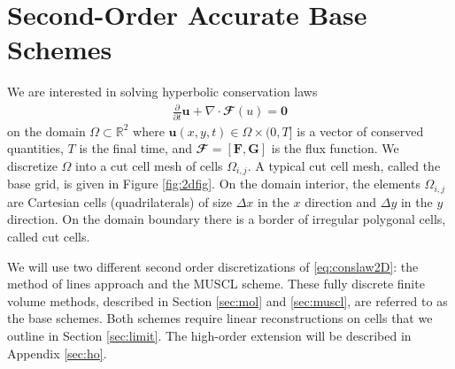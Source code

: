 \section{Second-Order Accurate Base Schemes}\label{sec:basefv}
We are interested in solving hyperbolic conservation laws 
\begin{equation}
\begin{aligned} \label{eq:conslaw2D}
\frac{\partial}{\partial t}	\mathbf{u} + \nabla \cdot \mathbfcal{F}(u)  = \mathbf{0}
\end{aligned}
\end{equation}
on the domain $\Omega \subset \mathbb{R}^2$ where $\mathbf{u}(x,y,t) \in \Omega \times (0,T]$ is a vector of conserved quantities, $T$ is the final time, and $\mathbfcal{F} = [\mathbf{F}, \mathbf{G}]$ is the flux function.  We discretize $\Omega$ into a cut cell mesh of cells $\Omega_{i,j}$.  A typical cut cell mesh, called the base grid, is given in Figure \ref{fig:2dfig}.  On the domain interior, the elements $\Omega_{i,j}$ are Cartesian cells (quadrilaterals) of size $\Delta x$ in the $x$ direction and $\Delta y$ in the $y$ direction.  On the domain boundary there is a border of irregular polygonal cells, called cut cells.  







We will use two different second order discretizations of \eqref{eq:conslaw2D}: the method of lines approach and the MUSCL scheme.
These fully discrete finite volume methods, described in Section \ref{sec:mol} and \ref{sec:muscl}, are referred to as the base schemes.  Both schemes require linear reconstructions on cells that we outline in Section \ref{sec:limit}.  The high-order extension will be described in Appendix \ref{sec:ho}. 

